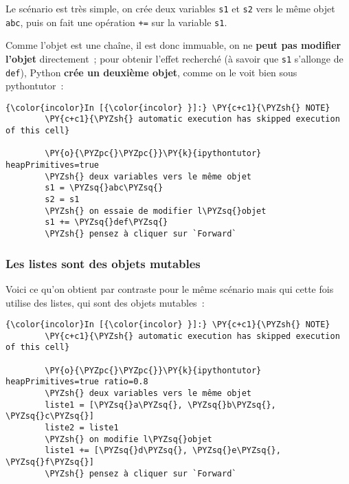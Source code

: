     Le scénario est très simple, on crée deux variables \texttt{s1} et
\texttt{s2} vers le même objet
\texttt{\textquotesingle{}abc\textquotesingle{}}, puis on fait une
opération \texttt{+=} sur la variable \texttt{s1}.

Comme l'objet est une chaîne, il est donc immuable, on ne \textbf{peut
pas modifier l'objet} directement~; pour obtenir l'effet recherché (à
savoir que \texttt{s1} s'allonge de
\texttt{\textquotesingle{}def\textquotesingle{}}), Python \textbf{crée
un deuxième objet}, comme on le voit bien sous pythontutor~:

    \begin{Verbatim}[commandchars=\\\{\}]
{\color{incolor}In [{\color{incolor} }]:} \PY{c+c1}{\PYZsh{} NOTE}
        \PY{c+c1}{\PYZsh{} automatic execution has skipped execution of this cell}
        
        \PY{o}{\PYZpc{}\PYZpc{}}\PY{k}{ipythontutor} heapPrimitives=true
        \PYZsh{} deux variables vers le même objet
        s1 = \PYZsq{}abc\PYZsq{}
        s2 = s1
        \PYZsh{} on essaie de modifier l\PYZsq{}objet
        s1 += \PYZsq{}def\PYZsq{}
        \PYZsh{} pensez à cliquer sur `Forward`
\end{Verbatim}


    \hypertarget{les-listes-sont-des-objets-mutables}{%
\subsubsection{Les listes sont des objets
mutables}\label{les-listes-sont-des-objets-mutables}}

    Voici ce qu'on obtient par contraste pour le même scénario mais qui
cette fois utilise des listes, qui sont des objets mutables~:

    \begin{Verbatim}[commandchars=\\\{\}]
{\color{incolor}In [{\color{incolor} }]:} \PY{c+c1}{\PYZsh{} NOTE}
        \PY{c+c1}{\PYZsh{} automatic execution has skipped execution of this cell}
        
        \PY{o}{\PYZpc{}\PYZpc{}}\PY{k}{ipythontutor} heapPrimitives=true ratio=0.8
        \PYZsh{} deux variables vers le même objet
        liste1 = [\PYZsq{}a\PYZsq{}, \PYZsq{}b\PYZsq{}, \PYZsq{}c\PYZsq{}]
        liste2 = liste1
        \PYZsh{} on modifie l\PYZsq{}objet
        liste1 += [\PYZsq{}d\PYZsq{}, \PYZsq{}e\PYZsq{}, \PYZsq{}f\PYZsq{}]
        \PYZsh{} pensez à cliquer sur `Forward`
\end{Verbatim}


